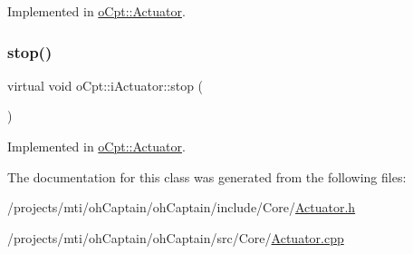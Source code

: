 Implemented in \hyperlink{classo_cpt_1_1_actuator_a3a3813e5730f0257e74de7300eeeffa1}{o\+Cpt\+::\+Actuator}.

\hypertarget{classo_cpt_1_1i_actuator_ae3f9fbb61d920bee1bd297fb5a89625e}{}\label{classo_cpt_1_1i_actuator_ae3f9fbb61d920bee1bd297fb5a89625e} 
\subsubsection{\texorpdfstring{stop()}{stop()}}
{\footnotesize\ttfamily virtual void o\+Cpt\+::i\+Actuator\+::stop (\begin{DoxyParamCaption}{ }\end{DoxyParamCaption})\hspace{0.3cm}{\ttfamily [pure virtual]}}



Implemented in \hyperlink{classo_cpt_1_1_actuator_aa41132ff134e8b067353459dedbb0f37}{o\+Cpt\+::\+Actuator}.



The documentation for this class was generated from the following files\+:\begin{DoxyCompactItemize}
\item 
/projects/mti/oh\+Captain/oh\+Captain/include/\+Core/\hyperlink{_actuator_8h}{Actuator.\+h}\item 
/projects/mti/oh\+Captain/oh\+Captain/src/\+Core/\hyperlink{_actuator_8cpp}{Actuator.\+cpp}\end{DoxyCompactItemize}
